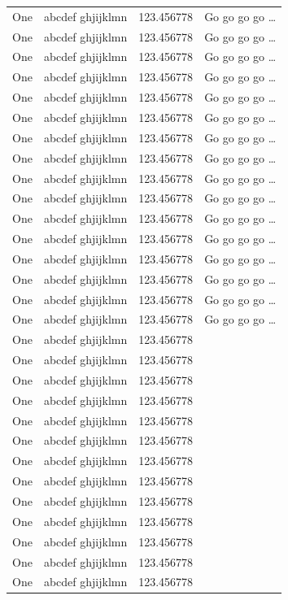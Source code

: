 \documentclass[phd,showgrids]{ndsu-thesis-2022}
\begin{document}
\begin{longtable}{l l l l}
One & abcdef ghjijklmn & 123.456778  & Go go go go \ldots \\
One & abcdef ghjijklmn & 123.456778  & Go go go go \ldots \\
One & abcdef ghjijklmn & 123.456778  & Go go go go \ldots \\
One & abcdef ghjijklmn & 123.456778  & Go go go go \ldots \\
One & abcdef ghjijklmn & 123.456778  & Go go go go \ldots \\
One & abcdef ghjijklmn & 123.456778  & Go go go go \ldots \\
One & abcdef ghjijklmn & 123.456778  & Go go go go \ldots \\
One & abcdef ghjijklmn & 123.456778  & Go go go go \ldots \\
One & abcdef ghjijklmn & 123.456778  & Go go go go \ldots \\
One & abcdef ghjijklmn & 123.456778  & Go go go go \ldots \\
One & abcdef ghjijklmn & 123.456778  & Go go go go \ldots \\
One & abcdef ghjijklmn & 123.456778  & Go go go go \ldots \\
One & abcdef ghjijklmn & 123.456778  & Go go go go \ldots \\
One & abcdef ghjijklmn & 123.456778  & Go go go go \ldots \\
One & abcdef ghjijklmn & 123.456778  & Go go go go \ldots \\
One & abcdef ghjijklmn & 123.456778  & Go go go go \ldots \\
One & abcdef ghjijklmn & 123.456778 \\
One & abcdef ghjijklmn & 123.456778 \\
One & abcdef ghjijklmn & 123.456778 \\
One & abcdef ghjijklmn & 123.456778 \\
One & abcdef ghjijklmn & 123.456778 \\
One & abcdef ghjijklmn & 123.456778 \\
One & abcdef ghjijklmn & 123.456778 \\
One & abcdef ghjijklmn & 123.456778 \\
One & abcdef ghjijklmn & 123.456778 \\
One & abcdef ghjijklmn & 123.456778 \\
One & abcdef ghjijklmn & 123.456778 \\
One & abcdef ghjijklmn & 123.456778 \\
One & abcdef ghjijklmn & 123.456778 \\

\end{longtable}
\end{document}
